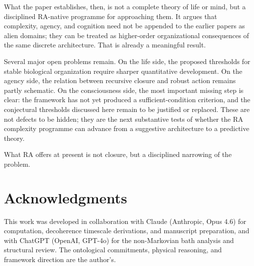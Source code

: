 \documentclass[11pt]{article}
\begin{document}
What the paper establishes, then, is not a complete theory of life or mind, but a disciplined RA-native programme for approaching them. It argues that complexity, agency, and cognition need not be appended to the earlier papers as alien domains; they can be treated as higher-order organizational consequences of the same discrete architecture. That is already a meaningful result.

Several major open problems remain. On the life side, the proposed thresholds for stable biological organization require sharper quantitative development. On the agency side, the relation between recursive closure and robust action remains partly schematic. On the consciousness side, the most important missing step is clear: the framework has not yet produced a sufficient-condition criterion, and the conjectural thresholds discussed here remain to be justified or replaced. These are not defects to be hidden; they are the next substantive tests of whether the RA complexity programme can advance from a suggestive architecture to a predictive theory.

What RA offers at present is not closure, but a disciplined narrowing of the problem.

\section*{Acknowledgments}

This work was developed in collaboration with Claude (Anthropic, Opus 4.6) for computation, decoherence timescale derivations, and manuscript preparation, and with ChatGPT (OpenAI, GPT-4o) for the non-Markovian bath analysis and structural review. The ontological commitments, physical reasoning, and framework direction are the author's.
\end{document}
